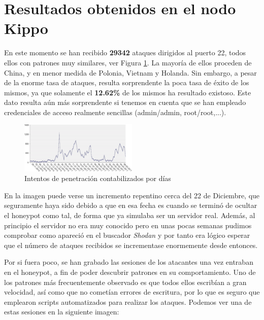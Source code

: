 \documentclass[journal]{IEEEtran}
\begin{document}
\section{Resultados obtenidos en el nodo Kippo}

En este momento se han recibido \textbf{29342} ataques dirigidos al puerto 22, todos ellos con patrones muy similares, ver Figura \ref{fig:pruebas_dia}. La mayoría de ellos proceden de China, y en menor medida de Polonia, Vietnam y Holanda. Sin embargo, a pesar de la enorme tasa de ataques, resulta sorprendente la poca tasa de éxito de los mismos, ya que solamente el \textbf{12.62\%} de los mismos ha resultado existoso. Este dato resulta aún más sorprendente si tenemos en cuenta que se han empleado credenciales de acceso realmente sencillas (admin/admin, root/root,...).

\begin{figure}
\centering
\includegraphics[width=0.5\textwidth]{img/pruebas_dia}
\caption{Intentos de penetración contabilizados por días}
\label{fig:pruebas_dia}
\end{figure}

En la imagen puede verse un incremento repentino cerca del 22 de Diciembre, que seguramente haya sido debido a que en esa fecha es cuando se terminó de ocultar el honeypot como tal, de forma que ya simulaba ser un servidor real. Además, al principio el servidor no era muy conocido pero en unas pocas semanas pudimos comprobar como apareció en el buscador \textit{Shodan} \cite{shodan} y por tanto era lógico esperar que el número de ataques recibidos se incrementase enormemente desde entonces.

Por si fuera poco, se han grabado las sesiones de los atacantes una vez entraban en el honeypot, a fin de poder descubrir patrones en su comportamiento. Uno de los patrones más frecuentemente observado es que todos ellos escribían a gran velocidad, así como que no cometían errores de escritura, por lo que es seguro que emplearon scripts automatizados para realizar los ataques. Podemos ver una de estas sesiones en la siguiente imagen:
\end{document}
